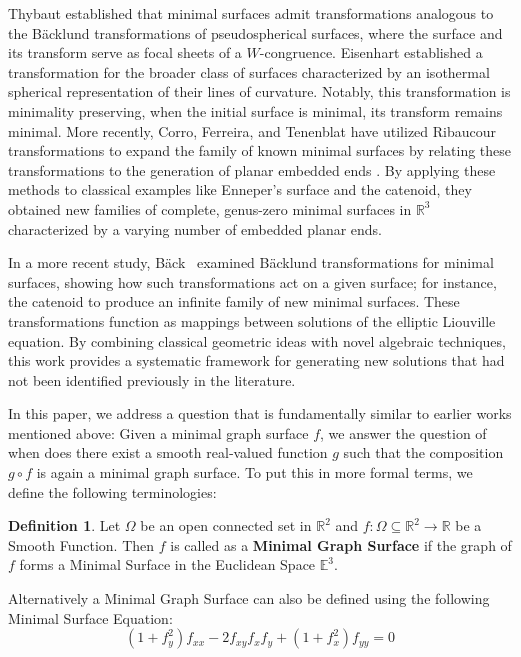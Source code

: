 \documentclass[12pt]{article}
\theoremstyle{plain}
\theoremstyle{definition}
\newtheorem{definition}[theorem]{Definition}
\theoremstyle{remark}
\begin{document}
	 Thybaut \cite{Thy} established that minimal surfaces admit transformations analogous to the Bäcklund transformations of pseudospherical surfaces, where the surface and its transform serve as focal sheets of a $W$-congruence. Eisenhart \cite{Eis} established a transformation for the broader class of surfaces characterized by an isothermal spherical representation of their lines of curvature. Notably, this transformation is minimality preserving, when the initial surface is minimal, its transform remains minimal. More recently, Corro, Ferreira, and Tenenblat \cite{CFT} have utilized Ribaucour transformations to expand the family of known minimal surfaces by relating these transformations to the generation of planar embedded ends . By applying these methods to classical examples like Enneper’s surface and the catenoid, they obtained new families of complete, genus-zero minimal surfaces in $\mathbb{R}^3$ characterized by a varying number of embedded planar ends.
	 
	 In a more recent study, B{\"a}ck~\cite{PB} examined B{\"a}cklund transformations for minimal surfaces, showing how such transformations act on a given surface; for instance, the catenoid to produce an infinite family of new minimal surfaces. These transformations function as mappings between solutions of the elliptic Liouville equation. By combining classical geometric ideas with novel algebraic techniques, this work provides a systematic framework for generating new solutions that had not been identified previously in the literature.
	 
	 In this paper, we address a question that is fundamentally similar to earlier works mentioned above: Given a minimal graph surface \(f\), we answer the question of when does there exist a smooth real‑valued function \(g\) such that the composition \(g\circ f\) is again a minimal graph surface. To put this in more formal terms, we define the following terminologies:
	 
	 \begin{definition}
	 	Let \(\Omega\) be an open connected set in \(\mathbb{R}^2\) and \(f: \Omega \subseteq \mathbb{R}^2 \longrightarrow \mathbb{R}\) be a Smooth Function. Then \(f\) is called as a \textbf{Minimal Graph Surface} if the graph of \(f\) forms a Minimal Surface in the Euclidean Space \(\mathbb{E}^3\). 
	 	
	 	Alternatively a Minimal Graph Surface can also be defined using the following Minimal Surface Equation:
	 	\begin{equation}
	 		\label{eqn: MSE}
	 		(1 + f_y^2) f_{xx} - 2 f_{xy} f_x f_y + (1 + f_x^2) f_{yy} = 0
	 	\end{equation}
	 \end{definition}
	 
\end{document}
